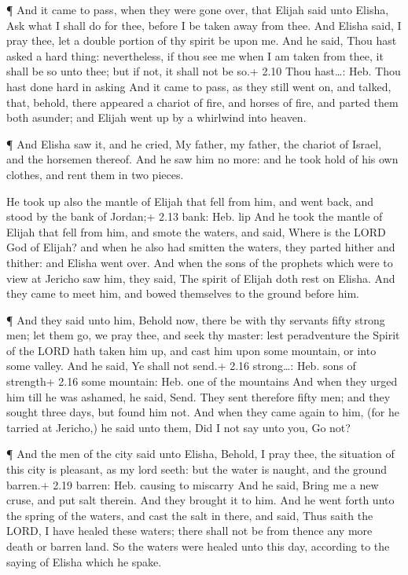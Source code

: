  ¶ And it came to pass, when they were gone over, that
Elijah said unto Elisha, Ask what I shall do for thee, before I be taken
away from thee. And Elisha said, I pray thee, let a double portion of
thy spirit be upon me.  And he said, Thou hast asked a hard
thing: nevertheless, if thou see me when I am taken from thee, it shall
be so unto thee; but if not, it shall not be so.+ 2.10 Thou hast\ldots:
Heb. Thou hast done hard in asking  And it came to pass, as
they still went on, and talked, that, behold, there appeared a chariot
of fire, and horses of fire, and parted them both asunder; and Elijah
went up by a whirlwind into heaven.

 ¶ And Elisha saw it, and he cried, My father, my father,
the chariot of Israel, and the horsemen thereof. And he saw him no more:
and he took hold of his own clothes, and rent them in two pieces.

 He took up also the mantle of Elijah that fell from him,
and went back, and stood by the bank of Jordan;+ 2.13 bank: Heb. lip
 And he took the mantle of Elijah that fell from him, and
smote the waters, and said, Where is the LORD God of Elijah? and when he
also had smitten the waters, they parted hither and thither: and Elisha
went over.  And when the sons of the prophets which were to
view at Jericho saw him, they said, The spirit of Elijah doth rest on
Elisha. And they came to meet him, and bowed themselves to the ground
before him.

 ¶ And they said unto him, Behold now, there be with thy
servants fifty strong men; let them go, we pray thee, and seek thy
master: lest peradventure the Spirit of the LORD hath taken him up, and
cast him upon some mountain, or into some valley. And he said, Ye shall
not send.+ 2.16 strong\ldots: Heb. sons of strength+ 2.16 some mountain:
Heb. one of the mountains  And when they urged him till he
was ashamed, he said, Send. They sent therefore fifty men; and they
sought three days, but found him not.  And when they came
again to him, (for he tarried at Jericho,) he said unto them, Did I not
say unto you, Go not?

 ¶ And the men of the city said unto Elisha, Behold, I pray
thee, the situation of this city is pleasant, as my lord seeth: but the
water is naught, and the ground barren.+ 2.19 barren: Heb. causing to
miscarry  And he said, Bring me a new cruse, and put salt
therein. And they brought it to him.  And he went forth
unto the spring of the waters, and cast the salt in there, and said,
Thus saith the LORD, I have healed these waters; there shall not be from
thence any more death or barren land.  So the waters were
healed unto this day, according to the saying of Elisha which he spake.

